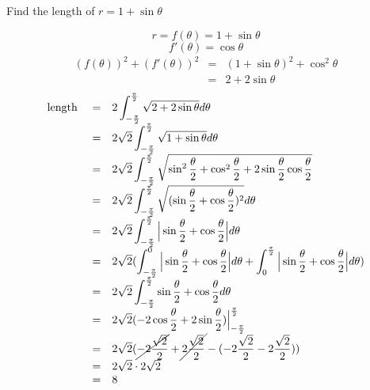 \begin{eg}
Find the length of \( r = 1 + \sin \theta\)

\soln
\[r = f(\theta) = 1 + \sin \theta\] 
\[f'(\theta) = \cos \theta\]
\[\begin{array}{rcl}
(f(\theta))^2 + (f'(\theta))^2 & = & (1 + \sin \theta)^2 + \cos^2 \theta\\
& = & 2 + 2\sin \theta
\end{array}\]
\[\begin{array}{rcl}
\text{length } & = & \displaystyle 2 \int^{\frac{\pi}{2}}_{- \frac{\pi}{2}} \sqrt{2 + 2\sin \theta} d\theta\\
& = & 2 \sqrt{2} \displaystyle \int^{\frac{\pi}{2}}_{-\frac{\pi}{2}} \sqrt{1 + \sin \theta} d\theta\\
& = & 2 \sqrt{2} \displaystyle \int^{\frac{\pi}{2}}_{-\frac{\pi}{2}} \sqrt{\sin^2 \frac{\theta}{2} + \cos^2 \frac{\theta}{2} + 2 \sin \frac{\theta}{2} \cos \frac{\theta}{2}}\\
& = & 2 \sqrt{2} \displaystyle \int^{\frac{\pi}{2}}_{-\frac{\pi}{2}} \sqrt{(\sin \frac{\theta}{2} + \cos \frac{\theta}{2})^2} d\theta\\
& = & 2 \sqrt{2} \displaystyle \int^{\frac{\pi}{2}}_{-\frac{\pi}{2}} \Big| \sin \frac{\theta}{2} + \cos \frac{\theta}{2} \Big| d\theta\\
& = & 2 \sqrt{2} \displaystyle (\int^{0}_{-\frac{\pi}{2}} \Big| \sin \frac{\theta}{2} + \cos \frac{\theta}{2} \Big| d\theta + \int^{\frac{\pi}{2}}_0 \Big| \sin \frac{\theta}{2} + \cos \frac{\theta}{2} \Big| d\theta)\\
& = & 2 \sqrt{2} \displaystyle \int^{\frac{\pi}{2}}_{-\frac{\pi}{2}} \sin \frac{\theta}{2} + \cos \frac{\theta}{2} d\theta\\
& = & 2 \sqrt{2} \displaystyle (-2 \cos \frac{\theta}{2} + 2 \sin \frac{\theta}{2}) \Big|^{\frac{\pi}{2}}_{-\frac{\pi}{2}}\\
& = & 2 \sqrt{2} \displaystyle (\cancel{-2 \frac{\sqrt{2}}{2}} + \cancel{2 \frac{\sqrt{2}}{2}} - (-2 \frac{\sqrt{2}}{2} - 2 \frac{\sqrt{2}}{2}))\\
& = & 2 \sqrt{2} \cdot 2 \sqrt{2}\\
& = & 8
\end{array}\]
\end{eg}
